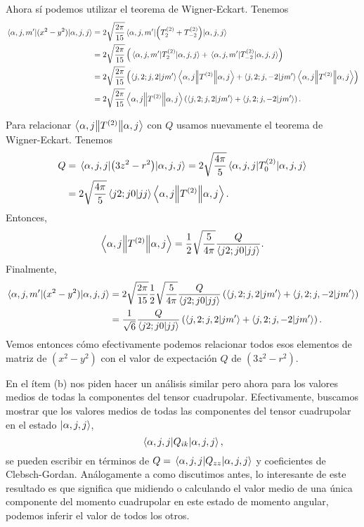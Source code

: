 \documentclass[10pt, a4paper]{article}
\numberwithin{equation}{subsection}
\begin{document}
Ahora sí podemos utilizar el teorema de Wigner-Eckart. Tenemos
\begin{align}
  \matrixel{\alpha,j,m'}{(x^2 - y^2)}{\alpha,j,j}
  &= 2\sqrt{\frac{2\pi}{15}}\matrixel{\alpha,j,m'}{\left(T^{(2)}_{2} +
    T^{(2)}_{-2}\right)}{\alpha,j,j} \nonumber \\
  &= 2\sqrt{\frac{2\pi}{15}}\left(
    \matrixel{\alpha,j,m'}{T^{(2)}_{2}}{\alpha,j,j} +
    \matrixel{\alpha,j,m'}{T^{(2)}_{-2}}{\alpha,j,j}\right) \nonumber \\
  &= 2\sqrt{\frac{2\pi}{15}}\left(
    \braket{j,2;j,2}{jm'} \doublebarmel{\alpha,j}{T^{(2)}}{\alpha,j} +
    \braket{j,2;j,-2}{jm'}
    \doublebarmel{\alpha,j}{T^{(2)}}{\alpha,j}\right) \nonumber \\
  &= 2\sqrt{\frac{2\pi}{15}} \doublebarmel{\alpha,j}{T^{(2)}}{\alpha,j} \left(
    \braket{j,2;j,2}{jm'} + \braket{j,2;j,-2}{jm'} \right).
\end{align}

Para relacionar $\left\langle{\alpha,j}\middle\|{T^{(2)}}\middle\|{\alpha,j}\right\rangle$ con $Q$ usamos
nuevamente el teorema de Wigner-Eckart. Tenemos
\begin{align}
  Q &= \expval{\left(3z^2 - r^2\right)}{\alpha,j,j}
    = 2\sqrt{\frac{4\pi}{5}}\expval{T^{(2)}_{0}}{\alpha,j,j} \nonumber \\
    &= 2\sqrt{\frac{4\pi}{5}} \braket{j2;j0}{jj}
      \left\langle{\alpha,j}\middle\|{T^{(2)}}\middle\|{\alpha,j}\right\rangle.
\end{align}
Entonces,
\begin{equation} \label{eq:Qdoublebar}
  \left\langle{\alpha,j}\middle\|{T^{(2)}}\middle\|{\alpha,j}\right\rangle =
  \frac{1}{2}\sqrt{\frac{5}{4\pi}} \frac{Q}{\braket{j2;j0}{jj}}.
\end{equation}
Finalmente,
\begin{align} \label{eq:Qauxmatrixel}
  \matrixel{\alpha,j,m'}{(x^2 - y^2)}{\alpha,j,j}
    &= 2\sqrt{\frac{2\pi}{15}} 
    \frac{1}{2}\sqrt{\frac{5}{4\pi}} \frac{Q}{\braket{j2;j0}{jj}}
    \left( \braket{j,2;j,2}{jm'} + \braket{j,2;j,-2}{jm'} \right) \nonumber \\
  &= \frac{1}{\sqrt{6}} \frac{Q}{\braket{j2;j0}{jj}}
    \left( \braket{j,2;j,2}{jm'} + \braket{j,2;j,-2}{jm'} \right).
\end{align}
Vemos entonces cómo efectivamente podemos relacionar todos esos elementos de
matriz de $(x^2 - y^2)$ con el valor de expectación $Q$ de $(3z^2 - r^2)$.

\bigbreak
En el ítem (b) nos piden hacer un análisis similar pero ahora para los valores
medios de todas la componentes del tensor cuadrupolar. Efectivamente, buscamos
mostrar que los valores medios de todas las componentes del tensor cuadrupolar
en el estado $\ket{\alpha,j,j}$,
\begin{equation}
  \expval{Q_{ik}}{\alpha,j,j},
\end{equation}
se pueden escribir en términos de $Q = \expval{Q_{zz}}{\alpha,j,j}$ y
coeficientes de Clebsch-Gordan. Análogamente a como discutimos antes, lo
interesante de este resultado es que significa que midiendo o calculando el
valor medio de una única componente del momento cuadrupolar en este estado de
momento angular, podemos inferir el valor de todos los otros.
\end{document}
